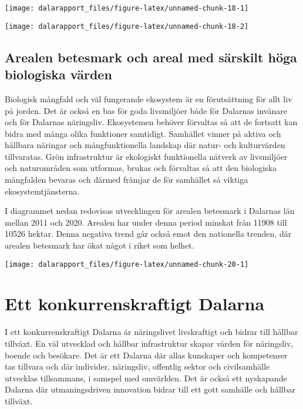 \documentclass[
]{article}
\begin{document}
\begin{center}\texttt{[image: dalarapport\_files/figure-latex/unnamed-chunk-18-1]} \end{center}

\begin{center}\texttt{[image: dalarapport\_files/figure-latex/unnamed-chunk-18-2]} \end{center}

\hypertarget{arealen-betesmark-och-areal-med-suxe4rskilt-huxf6ga-biologiska-vuxe4rden}{%
\subsection{Arealen betesmark och areal med särskilt höga biologiska
värden}\label{arealen-betesmark-och-areal-med-suxe4rskilt-huxf6ga-biologiska-vuxe4rden}}

Biologisk mångfald och väl fungerande ekosystem är en förutsättning för
allt liv på jorden. Det är också en bas för goda livsmiljöer både för
Dalarnas invånare och för Dalarnas näringsliv. Ekosystemen behöver
förvaltas så att de fortsatt kan bidra med många olika funktioner
samtidigt. Samhället vinner på aktiva och hållbara näringar och
mångfunktionella landskap där natur- och kulturvärden tillvaratas. Grön
infrastruktur är ekologiskt funktionella nätverk av livsmiljöer och
naturområden som utformas, brukas och förvaltas så att den biologiska
mångfalden bevaras och därmed främjar de för samhället så viktiga
ekosystemtjänsterna.

I diagrammet nedan redovisas utvecklingen för arealen betesmark i
Dalarnas län mellan 2011 och 2020. Arealen har under denna period
minskat från 11908 till 10526 hektar. Denna negativa trend går också
emot den nationella trenden, där arealen betesmark har ökat något i
riket som helhet.

\begin{center}\texttt{[image: dalarapport\_files/figure-latex/unnamed-chunk-20-1]} \end{center}

\hypertarget{ett-konkurrenskraftigt-dalarna}{%
\section{Ett konkurrenskraftigt
Dalarna}\label{ett-konkurrenskraftigt-dalarna}}

I ett konkurrenskraftigt Dalarna är näringslivet livskraftigt och bidrar
till hållbar tillväxt. En väl utvecklad och hållbar infrastruktur skapar
värden för näringsliv, boende och besökare. Det är ett Dalarna där allas
kunskaper och kompetenser tas tillvara och där individer, näringsliv,
offentlig sektor och civilsamhälle utvecklas tillsammans, i samspel med
omvärlden. Det är också ett nyskapande Dalarna där utmaningsdriven
innovation bidrar till ett gott samhälle och hållbar tillväxt.
\end{document}
